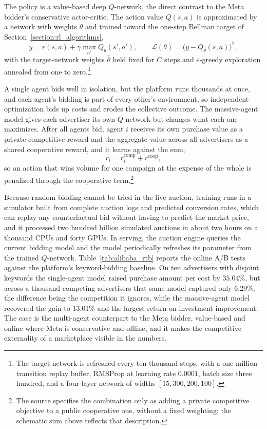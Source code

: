 The policy is a value-based deep $Q$-network, the direct contrast to the Meta bidder's conservative actor-critic. The action value $Q(s,a)$ is approximated by a network with weights $\theta$ and trained toward the one-step Bellman target of Section~\ref{section:rl_algorithms},
\begin{equation}
y=r(s,a)+\gamma\max_{a'}Q_{\bar\theta}(s',a'),\qquad
\mathcal{L}(\theta)=\big(y-Q_\theta(s,a)\big)^2,
\end{equation}
with the target-network weights $\bar\theta$ held fixed for $C$ steps and $\varepsilon$-greedy exploration annealed from one to zero.\footnote{The target network is refreshed every ten thousand steps, with a one-million transition replay buffer, RMSProp at learning rate $0.0001$, batch size three hundred, and a four-layer network of widths $[15,300,200,100]$.}

A single agent bids well in isolation, but the platform runs thousands at once, and each agent's bidding is part of every other's environment, so independent optimization bids up costs and erodes the collective outcome. The massive-agent model gives each advertiser its own $Q$-network but changes what each one maximizes. After all agents bid, agent $i$ receives its own purchase value as a private competitive reward and the aggregate value across all advertisers as a shared cooperative reward, and it learns against the sum,
\begin{equation}
r_i = r_i^{\mathrm{comp}} + r^{\mathrm{coop}},
\end{equation}
so an action that wins volume for one campaign at the expense of the whole is penalized through the cooperative term.\footnote{The source specifies the combination only as adding a private competitive objective to a public cooperative one, without a fixed weighting; the schematic sum above reflects that description.}

Because random bidding cannot be tried in the live auction, training runs in a simulator built from complete auction logs and predicted conversion rates, which can replay any counterfactual bid without having to predict the market price, and it processed two hundred billion simulated auctions in about two hours on a thousand CPUs and forty GPUs. In serving, the auction engine queries the current bidding model and the model periodically refreshes its parameter from the trained $Q$-network. Table~\ref{tab:alibaba_rtb} reports the online A/B tests against the platform's keyword-bidding baseline. On ten advertisers with disjoint keywords the single-agent model raised purchase amount per cost by $35.04\%$, but across a thousand competing advertisers that same model captured only $6.29\%$, the difference being the competition it ignores, while the massive-agent model recovered the gain to $13.01\%$ and the largest return-on-investment improvement. The case is the multi-agent counterpart to the Meta bidder, value-based and online where Meta is conservative and offline, and it makes the competitive externality of a marketplace visible in the numbers.

